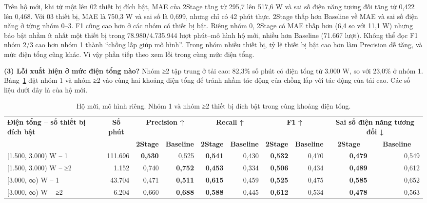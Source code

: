 Trên hộ mới, khi từ một lên 02 thiết bị đích bật, MAE của 2Stage tăng từ 295,7 lên 517,6 W và sai số điện năng tương đối tăng từ 0,422 lên 0,468. Với 03 thiết bị, MAE là 750,3 W và sai số là 0,699, nhưng chỉ có 42 phút thực. 2Stage thấp hơn Baseline về MAE và sai số điện năng ở từng nhóm 0–3. F1 cũng cao hơn ở các nhóm có thiết bị bật. Riêng nhóm 0, 2Stage có MAE thấp hơn (6,4 so với 11,1 W) nhưng báo bật nhầm ít nhất một thiết bị trong 78.980/4.735.944 lượt phút–mô hình hộ mới, nhiều hơn Baseline (71.667 lượt). Không thể đọc F1 nhóm 2/3 cao hơn nhóm 1 thành “chồng lấp giúp mô hình”. Trong nhóm nhiều thiết bị, tỷ lệ thiết bị bật cao hơn làm Precision dễ tăng, và mức điện tổng cũng khác. Vì vậy phần tiếp theo xem lỗi trong cùng mức điện tổng.

\textbf{(3) Lỗi xuất hiện ở mức điện tổng nào?} Nhóm ≥2 tập trung ở tải cao: 82,3\% số phút có điện tổng từ 3.000 W, so với 23,0\% ở nhóm 1. Bảng~\ref{nilm:tab9} đặt nhóm 1 và nhóm ≥2 vào cùng hai khoảng điện tổng để tránh nhầm tác động của chồng lấp với tác động của tải cao. Các số liệu dưới đây là của hộ mới.


\begin{table}[H]
\centering
\caption{Hộ mới, mô hình riêng. Nhóm 1 và nhóm ≥2 thiết bị đích bật trong cùng khoảng điện tổng.}\label{nilm:tab9}
\footnotesize
\setlength{\tabcolsep}{3.5pt}\renewcommand{\arraystretch}{1.12}
\begin{adjustbox}{max width=\linewidth}
\begin{tabular}{|l|r|r|r|r|r|r|r|r|r|}
\hline
\multirow{2}{*}{\textbf{Điện tổng – số thiết bị đích bật}} & \multicolumn{1}{c|}{\multirow{2}{*}{\textbf{Số phút}}} & \multicolumn{2}{c|}{\textbf{Precision ↑}} & \multicolumn{2}{c|}{\textbf{Recall ↑}} & \multicolumn{2}{c|}{\textbf{F1 ↑}} & \multicolumn{2}{c|}{\textbf{Sai số điện năng tương đối ↓}} \\ \cline{3-10}
 &  & \multicolumn{1}{c|}{\textbf{2Stage}} & \multicolumn{1}{c|}{\textbf{Baseline}} & \multicolumn{1}{c|}{\textbf{2Stage}} & \multicolumn{1}{c|}{\textbf{Baseline}} & \multicolumn{1}{c|}{\textbf{2Stage}} & \multicolumn{1}{c|}{\textbf{Baseline}} & \multicolumn{1}{c|}{\textbf{2Stage}} & \multicolumn{1}{c|}{\textbf{Baseline}} \\ \hline
{}[1.500, 3.000) W – 1 & 111.696 & \textbf{0,530} & 0,525 & \textbf{0,541} & 0,430 & \textbf{0,532} & 0,470 & \textbf{0,479} & 0,549 \\ \hline
{}[1.500, 3.000) W – ≥2 & 1.152 & 0,740 & \textbf{0,752} & \textbf{0,453} & 0,334 & \textbf{0,506} & 0,434 & \textbf{0,489} & 0,612 \\ \hline
{}[3.000, ∞) W – 1 & 43.704 & 0,471 & \textbf{0,511} & \textbf{0,615} & 0,459 & \textbf{0,525} & 0,475 & \textbf{0,585} & 0,652 \\ \hline
{}[3.000, ∞) W – ≥2 & 6.204 & 0,660 & \textbf{0,688} & \textbf{0,588} & 0,445 & \textbf{0,612} & 0,534 & \textbf{0,478} & 0,563 \\ \hline
\end{tabular}
\end{adjustbox}
\end{table}

